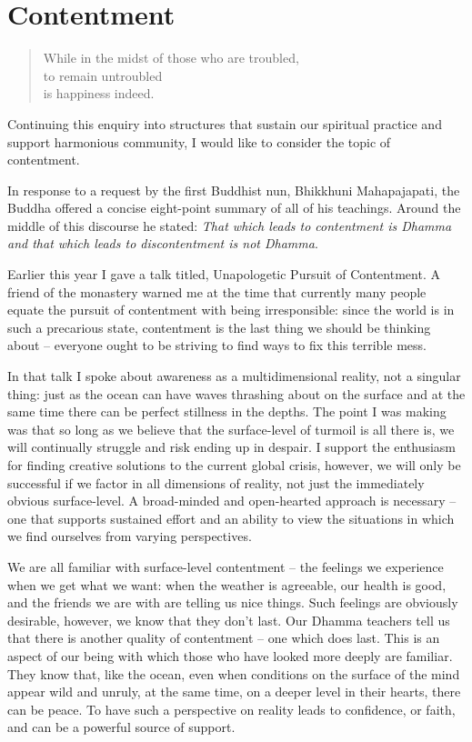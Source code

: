 \chapter{Contentment}

\begin{quote}
  While in the midst of those who are troubled,\\
  to remain untroubled\\
  is happiness indeed.

\end{quote}

Continuing this enquiry into structures that sustain our spiritual
practice and support harmonious community, I would like to consider the
topic of contentment.

In response to a request by the first Buddhist nun, Bhikkhuni
Mahapajapati\cite{mahapajapati}, the Buddha offered a concise eight-point
summary of all of his teachings. Around the middle of this discourse he
stated: \emph{That which leads to contentment is Dhamma and that which
leads to discontentment is not Dhamma}.

Earlier this year I gave a talk titled, Unapologetic Pursuit of
Contentment\cite{pursuit}.
A friend of the monastery warned me
at the time that currently many people equate the pursuit of contentment
with being irresponsible: since the world is in such a precarious state,
contentment is the last thing we should be thinking about -- everyone
ought to be striving to find ways to fix this terrible mess.

In that talk I spoke about awareness as a multidimensional reality, not
a singular thing: just as the ocean can have waves thrashing about on
the surface and at the same time there can be perfect stillness in the
depths. The point I was making was that so long as we believe that the
surface-level of turmoil is all there is, we will continually struggle
and risk ending up in despair. I support the enthusiasm for finding
creative solutions to the current global crisis, however, we will only be
successful if we factor in all dimensions of reality, not just the
immediately obvious surface-level. A broad-minded and open-hearted
approach is necessary -- one that supports sustained effort and an
ability to view the situations in which we find ourselves from varying
perspectives.

We are all familiar with surface-level contentment -- the feelings we
experience when we get what we want: when the weather is agreeable, our
health is good, and the friends we are with are telling us nice things.
Such feelings are obviously desirable, however, we know that they don't
last. Our Dhamma teachers tell us that there is another quality of
contentment -- one which does last. This is an aspect of our being with
which those who have looked more deeply are familiar. They know that,
like the ocean, even when conditions on the surface of the mind appear
wild and unruly, at the same time, on a deeper level in their hearts,
there can be peace. To have such a perspective on reality leads to
confidence, or faith, and can be a powerful source of support.

